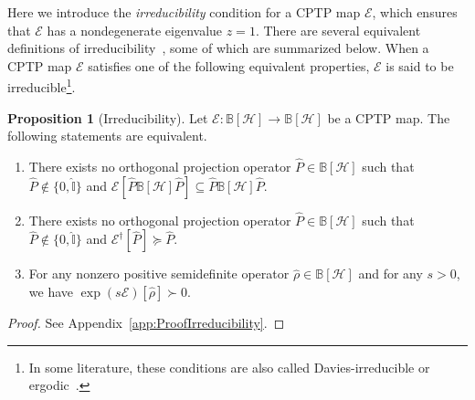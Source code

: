 \documentclass[preprint,pteplogo]{ptephy_v2}%
\numberwithin{equation}{section}
\theoremstyle{definition}
\newtheorem{proposition}[theorem]{Proposition}
\newcommand{\mc}[1]{\mathcal{#1}}
\newcommand{\mbb}[1]{\mathbb{#1}}
\begin{document}
Here we introduce the \emph{irreducibility} condition for a CPTP map $\mc{E}$, which ensures that $\mc{E}$ has a nondegenerate eigenvalue $z=1$.
There are several equivalent definitions of irreducibility~\cite{evans1978spectral, farenick1996irreducible, schrader2000perron, wolf2012quantum, Burgarth2013ergodic, carbone2016open, carbone2016irreducible}, some of which are summarized below. 
When a CPTP map $\mc{E}$ satisfies one of the following equivalent properties, $\mc{E}$ is said to be irreducible\footnote{
In some literature, these conditions are also called Davies-irreducible or ergodic~\cite{carbone2016open, carbone2016irreducible, zhang2024criteria}.
}.
\begin{proposition}[Irreducibility] \label{prop:irreducibility}
Let $\mc{E}: \mbb{B}[\mc{H}] \to \mbb{B}[\mc{H}]$ be a CPTP map. 
The following statements are equivalent.
\begin{enumerate}
\item There exists no orthogonal projection operator $\hat{P} \in \mbb{B}[\mc{H}]$ such that $\hat{P} \notin \{ 0, \hat{\mbb{I}} \}$ and $\mc{E}[\hat{P} \mbb{B}[\mc{H}] \hat{P}] \subseteq \hat{P} \mbb{B}[\mc{H}] \hat{P}$.
\item There exists no orthogonal projection operator $\hat{P} \in \mbb{B}[\mc{H}]$ such that $\hat{P} \notin \{ 0, \hat{\mbb{I}} \}$ and $\mc{E}^\dagger[\hat{P}] \succeq \hat{P}$.
\item For any nonzero positive semidefinite operator $\hat{\rho} \in \mbb{B}[\mc{H}]$ and for any $s > 0$, we have $\exp(s \mc{E})[\hat{\rho}] \succ 0$.
\end{enumerate}
\end{proposition}

\begin{proof}
See Appendix~\ref{app:ProofIrreducibility}.
\end{proof}
\end{document}
